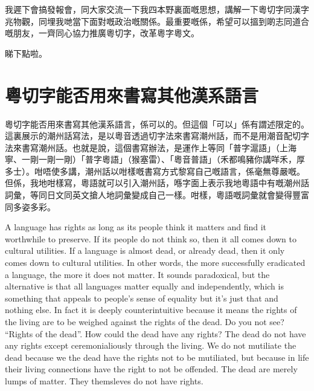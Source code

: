 我遲下會搞發報會，同大家交流一下我四本野裏面嘅思想，講解一下粵切字同漢字兆物觀，同埋我哋當下面對嘅政治嘅關係。最重要嘅係，希望可以搵到啲志同道合嘅朋友，一齊同心協力推廣粵切字，改革粵字粵文。

睇下點啦。



\section{粵切字能否用來書寫其他漢系語言}
粵切字能否用來書寫其他漢系語言，係可以的。但這個「可以」係有謂述限定的。這裏展示的潮州話寫法，是以粵音透過切字法來書寫潮州話，而不是用潮音配切字法來書寫潮州話。也就是說，這個書寫辦法，是運作上等同「普字滬語」（上海寧、一剛一剛一剛）「普字粵語」（猴塞雷）、「粵音普語」（禾都鳴豬你講咩禾，厚多士）。咁唔使多講，潮州話以咁樣嘅書寫方式黎寫自己嘅語言，係毫無尊嚴嘅。但係，我地咁樣寫，粵語就可以引入潮州話，喺字面上表示我地粵語中有嘅潮州話詞彙，等同日文同英文搶人地詞彙變成自己一樣。咁樣，粵語嘅詞彙就會變得豐富同多姿多彩。


A language has rights as long as its people think it matters and find it worthwhile to preserve. If its people do not think so, then it all comes down to cultural utilities. If a language is almost dead, or already dead, then it only comes down to cultural utilities. In other words, the more successfully eradicated a language, the more it does not matter. It sounds paradoxical, but the alternative is that all languages matter equally and independently, which is something that appeals to people’s sense of equality but it’s just that and nothing else. In fact it is deeply counterintuitive because it means the rights of the living are to be weighed against the rights of the dead. Do you not see? “Rights of the dead”. How could the dead have any rights? The dead do not have any rights except ceremonialiously through the living. We do not mutiliate the dead because we the dead have the rights not to be mutiliated, but because in life their living connections have the right to not be offended. The dead are merely lumps of matter. They themsleves do not have rights.
